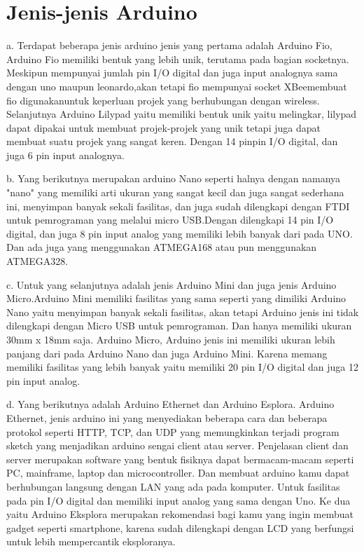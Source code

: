  \section{Jenis-jenis Arduino}
a.	Terdapat beberapa jenis arduino jenis yang pertama adalah Arduino Fio, Arduino Fio memiliki bentuk yang lebih unik, terutama pada bagian socketnya. Meskipun mempunyai jumlah pin I/O digital dan juga input analognya sama dengan uno maupun leonardo,akan tetapi fio mempunyai socket XBeemembuat fio digunakanuntuk keperluan projek yang berhubungan dengan wireless. Selanjutnya Arduino Lilypad yaitu memiliki bentuk unik yaitu melingkar, lilypad dapat dipakai untuk membuat projek-projek yang unik tetapi juga dapat membuat suatu projek yang sangat keren.
 	Dengan 14 pinpin I/O digital, dan juga 6 pin input analognya.
 

b. Yang berikutnya merupakan arduino Nano seperti halnya dengan namanya "nano" yang memiliki arti ukuran  yang sangat kecil dan juga sangat sederhana ini, menyimpan banyak sekali fasilitas, dan juga sudah dilengkapi dengan FTDI untuk pemrograman yang melalui micro USB.Dengan dilengkapi 14 pin I/O digital, dan juga 8 pin input analog yang memiliki lebih banyak dari pada UNO. Dan ada juga yang menggunakan ATMEGA168 atau pun menggunakan ATMEGA328.
 
c. Untuk yang selanjutnya adalah jenis Arduino Mini dan juga jenis Arduino Micro.Arduino Mini memiliki fasilitas yang sama seperti yang dimiliki Arduino Nano yaitu menyimpan banyak sekali fasilitas, akan tetapi Arduino jenis ini tidak dilengkapi dengan Micro USB untuk pemrograman. Dan hanya memiliki ukuran 30mm x 18mm saja.
 Arduino Micro, Arduino jenis ini memiliki ukuran lebih panjang dari pada Arduino Nano dan juga Arduino Mini. Karena memang memiliki fasilitas yang lebih banyak yaitu memiliki 20 pin I/O digital dan juga 12 pin input analog.
 
 
d. Yang berikutnya adalah Arduino Ethernet dan Arduino Esplora. Arduino Ethernet, jenis arduino ini yang menyediakan beberapa cara dan beberapa protokol seperti HTTP, TCP, dan UDP yang memungkinkan terjadi program sketch yang menjadikan arduino sengai client atau server. Penjelasan client dan server merupakan software yang bentuk fisiknya dapat bermacam-macam seperti PC, mainframe, laptop dan microcontroller. Dan membuat arduino kamu dapat berhubungan langsung dengan LAN yang ada pada komputer. Untuk fasilitas pada pin I/O digital dan memiliki input analog yang sama dengan Uno. 
Ke dua yaitu Arduino Eksplora merupakan rekomendasi bagi kamu yang ingin membuat gadget seperti smartphone, karena sudah dilengkapi dengan LCD yang berfungsi untuk lebih mempercantik eksploranya.
 

